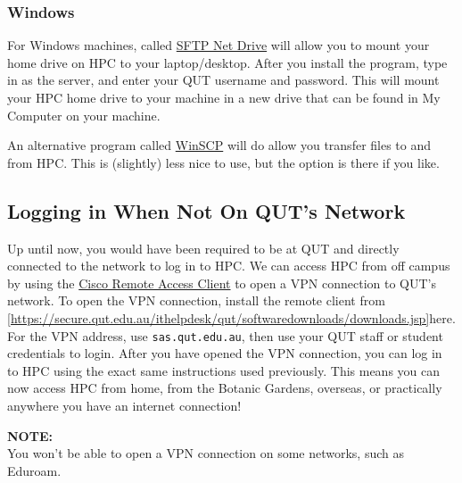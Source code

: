 \subsubsection{Windows}
For Windows machines, called \href{https://www.nsoftware.com/netdrive/sftp/}{SFTP Net Drive} will allow you to mount your home drive on HPC to your laptop/desktop. After you install the program, type in  as the server, and enter your QUT username and password. This will mount your HPC home drive to your machine in a new drive that can be found in My Computer on your machine.
%
\par
%
An alternative program called \href{https://winscp.net/eng/download.php}{WinSCP} will do allow you transfer files to and from HPC. This is (slightly) less nice to use, but the option is there if you like.
%
%
\subsection{Logging in When Not On QUT's Network}
%
%
Up until now, you would have been required to be at QUT and directly connected to the network to log in to HPC. We can access HPC from off campus by using the \href{https://secure.qut.edu.au/ithelpdesk/qut/softwaredownloads/downloads.jsp}{Cisco Remote Access Client} to open a VPN connection to QUT's network. To open the VPN connection, install the remote client from \ref{https://secure.qut.edu.au/ithelpdesk/qut/softwaredownloads/downloads.jsp}{here}. For the VPN address, use \texttt{sas.qut.edu.au}, then use your QUT staff or student credentials to login. After you have opened the VPN connection, you can log in to HPC using the exact same instructions used previously. This means you can now access HPC from home, from the Botanic Gardens, overseas, or practically anywhere you have an internet connection!
%
%
\par
\begin{story}
  \textbf{NOTE:}
  \\
  You won't be able to open a VPN connection on some networks, such as Eduroam.
\end{story}

